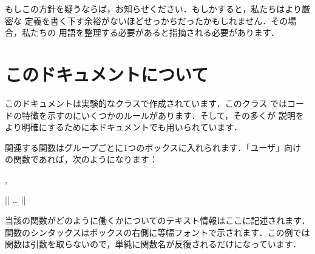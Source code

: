 \documentclass[uplatex,dvipdfmx,full,kernel]{wtpl3doc}
\begin{document}
もしこの方針を疑うならば，お知らせください．もしかすると，私たちはより厳密な
定義を書く下す余裕がないほどせっかちだったかもしれません．その場合，私たちの
用語を整理する必要があると指摘される必要があります．

\section{このドキュメントについて}

このドキュメントは実験的なクラスで作成されています．このクラス
ではコードの特徴を示すのにいくつかのルールがあります．そして，その多くが
説明をより明確にするために本ドキュメントでも用いられています．

関連する関数はグループごとに1つのボックスに入れられます．「ユーザ」向け
の関数であれば，次のようになります：
%
\begin{function}[label = ]{\ExplSyntaxOn, \ExplSyntaxOff}
  \begin{syntax}
    |\ExplSyntaxOn| \dots{} |\ExplSyntaxOff|
  \end{syntax}
  当該の関数がどのように働くかについてのテキスト情報はここに記述されます．
  関数のシンタックスはボックスの右側に等幅フォントで示されます．この例では
  関数は引数を取らないので，単純に関数名が反復されるだけになっています．
\end{function}
\end{document}
